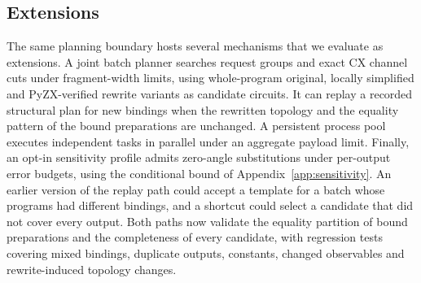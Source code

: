 \subsection{Extensions}
The same planning boundary hosts several mechanisms that we evaluate as extensions. A joint batch planner searches request groups and exact CX channel cuts under fragment-width limits, using whole-program original, locally simplified and PyZX-verified rewrite variants as candidate circuits. It can replay a recorded structural plan for new bindings when the rewritten topology and the equality pattern of the bound preparations are unchanged. A persistent process pool executes independent tasks in parallel under an aggregate payload limit. Finally, an opt-in sensitivity profile admits zero-angle substitutions under per-output error budgets, using the conditional bound of Appendix~\ref{app:sensitivity}. An earlier version of the replay path could accept a template for a batch whose programs had different bindings, and a shortcut could select a candidate that did not cover every output. Both paths now validate the equality partition of bound preparations and the completeness of every candidate, with regression tests covering mixed bindings, duplicate outputs, constants, changed observables and rewrite-induced topology changes.
